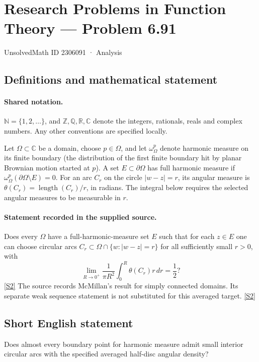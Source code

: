\documentclass[11pt]{article}
\newcommand{\sref}[2]{\hyperlink{source:#1:#2}{[S#2]}}
\begin{document}
\setcounter{section}{2306090}
\section{Research Problems in Function Theory — Problem 6.91}\label{2306091}
{\small\sffamily UnsolvedMath ID 2306091 · Analysis}
\subsection{Definitions and mathematical statement}

\paragraph{Shared notation.}$\mathbb N=\{1,2,\ldots\}$, and $\mathbb Z,\mathbb Q,\mathbb R,\mathbb C$ denote the integers, rationals, reals and complex numbers. Any other conventions are specified locally.


Let $\Omega\subset\mathbb C$ be a domain, choose $p\in\Omega$, and let $\omega_\Omega^p$ denote harmonic measure on its finite boundary (the distribution of the first finite boundary hit by planar Brownian motion started at $p$). A set $E\subset\partial\Omega$ has full harmonic measure if $\omega_\Omega^p(\partial\Omega\setminus E)=0$. For an arc $C_r$ on the circle $|w-z|=r$, its angular measure is $\theta(C_r)=\operatorname{length}(C_r)/r$, in radians. The integral below requires the selected angular measures to be measurable in $r$.
\paragraph{Statement recorded in the supplied source.}
Does every $\Omega$ have a full-harmonic-measure set $E$ such that for each $z\in E$ one can choose circular arcs $C_r\subset\Omega\cap\{w:|w-z|=r\}$ for all sufficiently small $r>0$, with \[\lim_{R\to0^+}\frac1{\pi R^2}\int_0^R\theta(C_r)r\,dr=\frac12?\] \sref{2306091}{2}
The source records McMillan's result for simply connected domains. Its separate weak sequence statement is not substituted for this averaged target. \sref{2306091}{2}
\subsection{Short English statement}
Does almost every boundary point for harmonic measure admit small interior circular arcs with the specified averaged half-disc angular density?
\end{document}
